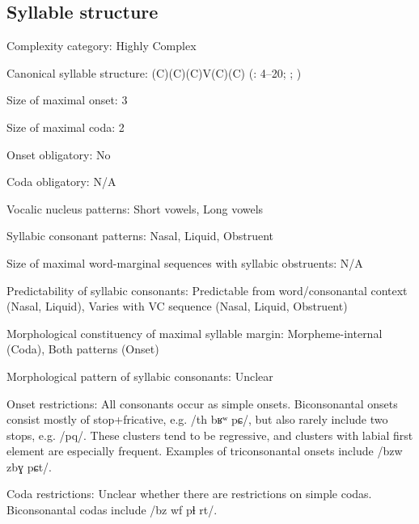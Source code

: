 {\subsection*{Syllable structure}
\begin{appendixdesc}

\item[Complexity category:] Highly Complex

\item[Canonical syllable structure:] (C)(C)(C)V(C)(C) (\citealt{Colarusso2006}: 4--20; \citealt[13]{Matasović2010}; \citealt{Applebaum2013})

\item[Size of maximal onset:] 3

\item[Size of maximal coda:] 2

\item[Onset obligatory:] No

\item[Coda obligatory:] N/A

\item[Vocalic nucleus patterns:] Short vowels, Long vowels

\item[Syllabic consonant patterns:] Nasal, Liquid, Obstruent

\item[Size of maximal word-marginal sequences with syllabic obstruents:] N/A

\item[Predictability of syllabic consonants:] Predictable from word/consonantal context (Nasal, Liquid), Varies with VC sequence (Nasal, Liquid, Obstruent)

\item[Morphological constituency of maximal syllable margin:] Morpheme-internal (Coda), Both patterns (Onset)

\item[Morphological pattern of syllabic consonants:] Unclear

\item[Onset restrictions:] All consonants occur as simple onsets. Biconsonantal onsets consist mostly of stop+fricative, e.g. /th bʁʷ pɕ/, but also rarely include two stops, e.g. /pq/. These clusters tend to be regressive, and clusters with labial first element are especially frequent. Examples of triconsonantal onsets include /bzw zbɣ pɕt/.

\item[Coda restrictions:] Unclear whether there are restrictions on simple codas. Biconsonantal codas include /bz wf pɬ rt/.


\end{appendixdesc}}
